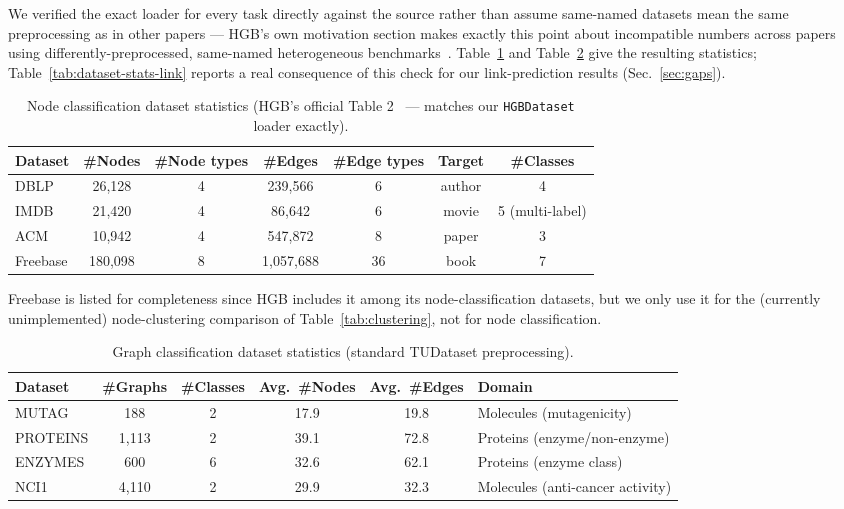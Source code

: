 \documentclass{article}
\begin{document}
We verified the exact loader for every task directly against the source rather than assume
same-named datasets mean the same preprocessing as in other papers --- HGB's own motivation section
makes exactly this point about incompatible numbers across papers using differently-preprocessed,
same-named heterogeneous benchmarks~\citep{lv2021hgb}. Table~\ref{tab:dataset-stats-node} and
Table~\ref{tab:dataset-stats-graph} give the resulting statistics; Table~\ref{tab:dataset-stats-link}
reports a real consequence of this check for our link-prediction results (Sec.~\ref{sec:gaps}).

\begin{table}[h]
  \centering
  \caption{Node classification dataset statistics (HGB's official Table 2~\citep{lv2021hgb} --- matches our \texttt{HGBDataset} loader exactly).}
  \label{tab:dataset-stats-node}
  \small
  \begin{tabular}{lcccccc}
    \toprule
    \textbf{Dataset} & \#Nodes & \#Node types & \#Edges & \#Edge types & Target & \#Classes \\
    \midrule
    DBLP & 26{,}128 & 4 & 239{,}566 & 6 & author & 4 \\
    IMDB & 21{,}420 & 4 & 86{,}642 & 6 & movie & 5 (multi-label) \\
    ACM & 10{,}942 & 4 & 547{,}872 & 8 & paper & 3 \\
    Freebase & 180{,}098 & 8 & 1{,}057{,}688 & 36 & book & 7 \\
    \bottomrule
  \end{tabular}
\end{table}
Freebase is listed for completeness since HGB includes it among its node-classification datasets,
but we only use it for the (currently unimplemented) node-clustering comparison of
Table~\ref{tab:clustering}, not for node classification.

\begin{table}[h]
  \centering
  \caption{Graph classification dataset statistics (standard TUDataset preprocessing).}
  \label{tab:dataset-stats-graph}
  \small
  \begin{tabular}{lccccl}
    \toprule
    \textbf{Dataset} & \#Graphs & \#Classes & Avg.\ \#Nodes & Avg.\ \#Edges & Domain \\
    \midrule
    MUTAG & 188 & 2 & 17.9 & 19.8 & Molecules (mutagenicity) \\
    PROTEINS & 1{,}113 & 2 & 39.1 & 72.8 & Proteins (enzyme/non-enzyme) \\
    ENZYMES & 600 & 6 & 32.6 & 62.1 & Proteins (enzyme class) \\
    NCI1 & 4{,}110 & 2 & 29.9 & 32.3 & Molecules (anti-cancer activity) \\
    \bottomrule
  \end{tabular}
\end{table}
\end{document}
